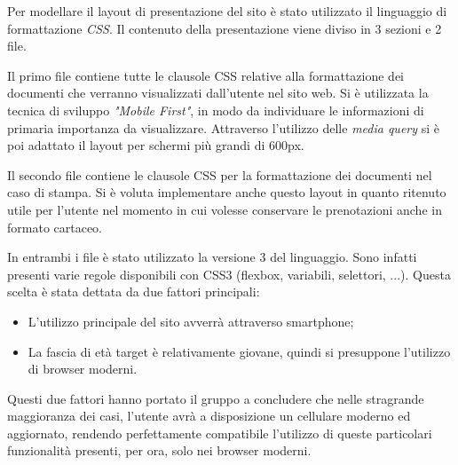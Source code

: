 Per modellare il layout di presentazione del sito è stato utilizzato il linguaggio di formattazione \textit{CSS}. Il contenuto della presentazione viene diviso in 3 sezioni e 2 file.

Il primo file contiene tutte le clausole CSS relative alla formattazione dei documenti che verranno visualizzati dall'utente nel sito web. Si è utilizzata la tecnica di sviluppo \textit{"Mobile First"}, in modo da individuare le informazioni di primaria importanza da visualizzare. Attraverso l'utilizzo delle \textit{media query} si è poi adattato il layout per schermi più grandi di 600px.

Il secondo file contiene le clausole CSS per la formattazione dei documenti nel caso di stampa. Si è voluta implementare anche questo layout in quanto ritenuto utile per l'utente nel momento in cui volesse conservare le prenotazioni anche in formato cartaceo.

In entrambi i file è stato utilizzato la versione 3 del linguaggio. Sono infatti presenti varie regole disponibili con CSS3 (flexbox, variabili, selettori, ...). Questa scelta è stata dettata da due fattori principali:
\begin{itemize}
\item L'utilizzo principale del sito avverrà attraverso smartphone;
\item La fascia di età target è relativamente giovane, quindi si presuppone l'utilizzo di browser moderni.
\end{itemize}

Questi due fattori hanno portato il gruppo a concludere che nelle stragrande maggioranza dei casi, l'utente avrà a disposizione un cellulare moderno ed aggiornato, rendendo perfettamente compatibile l'utilizzo di queste particolari funzionalità presenti, per ora, solo nei browser moderni.